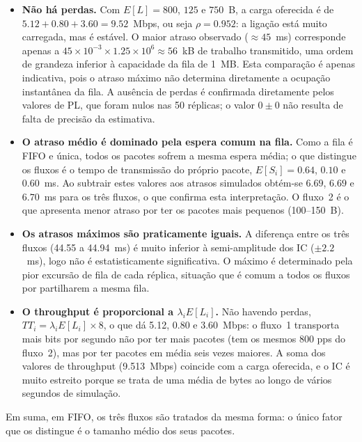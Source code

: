 \documentclass[11pt,a4paper]{article}
\begin{document}
\begin{itemize}
    \item \textbf{Não há perdas.} Com $E[L]=800$, $125$ e $750$~B, a carga
    oferecida é de $5.12+0.80+3.60=9.52$~Mbps, ou seja
    $\rho=0.952$: a ligação está muito carregada, mas é estável. O maior atraso
    observado ($\approx 45$~ms) corresponde apenas a
    $45\times10^{-3}\times1.25\times10^{6}\approx 56$~kB de trabalho
    transmitido, uma ordem de grandeza inferior à capacidade da fila de
    1~MB. Esta comparação é apenas indicativa, pois o atraso máximo não
    determina diretamente a ocupação instantânea da fila. A ausência de
    perdas é confirmada diretamente pelos valores de PL, que foram nulos nas
    50 réplicas; o valor $0\pm0$ não resulta de falta de precisão da
    estimativa.

    \item \textbf{O atraso médio é dominado pela espera comum na fila.} Como a
    fila é FIFO e única, todos os pacotes sofrem a mesma espera média; o que
    distingue os fluxos é o tempo de transmissão do próprio pacote,
    $E[S_i]=0.64$, $0.10$ e $0.60$~ms. Ao subtrair estes valores aos atrasos
    simulados obtém-se $6.69$, $6.69$ e $6.70$~ms para os três fluxos, o que
    confirma esta interpretação. O fluxo~2 é o que apresenta menor atraso por
    ter os pacotes mais pequenos (100--150~B).

    \item \textbf{Os atrasos máximos são praticamente iguais.} A diferença entre
    os três fluxos (44.55 a 44.94~ms) é muito inferior à semi-amplitude dos IC
    ($\pm2.2$~ms), logo não é estatisticamente significativa. O máximo é
    determinado pela pior excursão de fila de cada réplica, situação que é
    comum a todos os fluxos por partilharem a mesma fila.

    \item \textbf{O throughput é proporcional a $\lambda_i E[L_i]$.} Não havendo
    perdas, $TT_i=\lambda_i E[L_i]\times8$, o que dá 5.12, 0.80 e 3.60~Mbps: o
    fluxo~1 transporta mais bits por segundo não por ter mais pacotes (tem os
    mesmos 800 pps do fluxo~2), mas por ter pacotes em média seis vezes
    maiores. A soma dos valores de throughput (9.513~Mbps) coincide com a carga oferecida, e
    o IC é muito estreito porque se trata de uma média de bytes ao longo de
    vários segundos de simulação.
\end{itemize}

Em suma, em FIFO, os três fluxos são tratados da mesma forma: o
único fator que os distingue é o tamanho médio dos seus pacotes.
\end{document}
